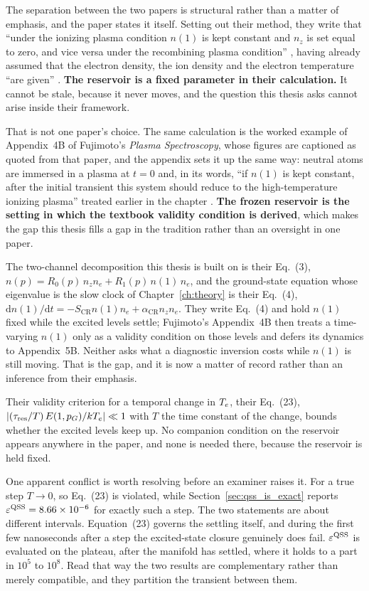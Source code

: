 The separation between the two papers is structural rather than a matter of
emphasis, and the paper states it itself. Setting out their method, they write
that \enquote{under the ionizing plasma condition $n(1)$ is kept constant and
$n_z$ is set equal to zero, and vice versa under the recombining plasma
condition} \cite[p.~5566]{SawadaFujimoto1994}, having already assumed that the
electron density, the ion density and the electron temperature
\enquote{are given} \cite[p.~5565]{SawadaFujimoto1994}. \textbf{The reservoir is
a fixed parameter in their calculation.} It cannot be stale, because it never
moves, and the question this thesis asks cannot arise inside their framework.

That is not one paper's choice. The same calculation is the worked example of
Appendix~4B of Fujimoto's \emph{Plasma Spectroscopy}, whose figures are
captioned as quoted from that paper, and the appendix sets it up the same way:
neutral atoms are immersed in a plasma at $t=0$ and, in its words, ``if $n(1)$
is kept constant, after the initial transient this system should reduce to the
high-temperature ionizing plasma'' treated earlier in the chapter
\cite[App.~4B]{Fujimoto2004}. \textbf{The frozen reservoir is the setting in which
the textbook validity condition is derived}, which makes the gap this thesis fills a gap in the
tradition rather than an oversight in one paper.

The two-channel decomposition this thesis is built on is their Eq.~(3),
$n(p) = R_0(p)\,n_z n_e + R_1(p)\,n(1)\,n_e$, and the ground-state equation
whose eigenvalue is the slow clock of Chapter~\ref{ch:theory} is their Eq.~(4),
$\mathrm{d}n(1)/\mathrm{d}t = -S_{\mathrm{CR}} n(1) n_e
+ \alpha_{\mathrm{CR}} n_z n_e$. They write Eq.~(4) and hold $n(1)$ fixed
while the excited levels settle; Fujimoto's Appendix~4B then treats a
time-varying $n(1)$ only as a validity condition on those levels and defers its
dynamics to Appendix~5B. Neither asks what a diagnostic inversion costs while
$n(1)$ is still moving. That is the gap, and it is now a matter of record
rather than an inference from their emphasis.

Their validity criterion for a temporal change in $T_e$, their Eq.~(23),
$|(\tau_{\mathrm{res}}/T)\,E(1,p_G)/kT_e| \ll 1$ with $T$ the time constant of
the change, bounds whether the excited levels keep up. No companion condition on
the reservoir appears anywhere in the paper, and none is needed there, because
the reservoir is held fixed.

One apparent conflict is worth resolving before an examiner raises it. For a
true step $T \to 0$, so Eq.~(23) is violated, while
Section~\ref{sec:qss_is_exact} reports $\varepsilon^{\mathrm{QSS}} = 8.66\times10^{-6}$ for exactly
such a step. The two statements are about different intervals. Equation~(23)
governs the settling itself, and during the first few nanoseconds after a step
the excited-state closure genuinely does fail. $\varepsilon^{\mathrm{QSS}}$ is evaluated on the
plateau, after the manifold has settled, where it holds to a part in $10^{5}$ to
$10^{8}$. Read that way the two results are complementary rather than merely
compatible, and they partition the transient between them.

